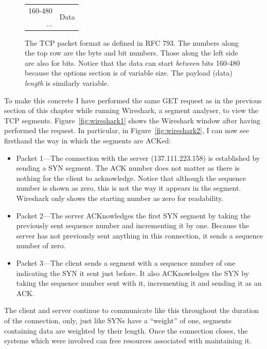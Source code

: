 \documentclass[11pt,a4paper]{report}
\newlength{\portraittextwidth}
\begin{document}
\begin{figure}
\begin{tabular}{r|c|c|c|c|c|c|c|c|c|c|c|c|c|c|c|c|c|c|c|c|c|c|c|c|c|c|c|c|c|c|c|c|}
		160-480 & \multicolumn{32}{c|}{\multirow{2}{*}{Data}}                                                                                                                                                                                     \\
		...     & \multicolumn{32}{c|}{}                                                                                                                                                                                                          \\ \cline{2-33} 
		\end{tabular}
		\captionsetup{width=\portraittextwidth}
		\caption{The TCP packet format as defined in RFC 793. The numbers along the top row are the byte and bit numbers. Those along the left side are also for bits. Notice that the data can start \textit{between} bits 160-480 because the options section is of variable size. The payload (data) \textit{length} is similarly variable.}
		\label{fig:tcpheader}
	\end{figure}
		
	To make this concrete I have performed the same GET request as in the previous section of this chapter while running Wireshark, a segment analyser, to view the TCP segments. Figure~\ref{fig:wireshark1} shows the Wireshark window after having performed the request. In particular, in Figure~\ref{fig:wireshark2}, I can now see firsthand the way in which the segments are ACKed:
	\begin{itemize}
		\item Packet 1---The connection with the server (137.111.223.158) is established by sending a SYN segment. The ACK number does not matter as there is nothing for the client to acknowledge. Notice that although the sequence number is shown as zero, this is not the way it appears in the segment. Wireshark only shows the starting number as zero for readability.
		\item Packet 2---The server ACKnowledges the first SYN segment by taking the previously sent sequence number and incrementing it by one. Because the server has not previously sent anything in this connection, it sends a sequence number of zero.
		\item Packet 3---The client sends a segment with a sequence number of one indicating the SYN it sent just before. It also ACKnowledges the SYN by taking the sequence number sent with it, incrementing it and sending it as an ACK.
	\end{itemize}
	The client and server continue to communicate like this throughout the duration of the connection, only, just like SYNs have a ``weight'' of one, segments containing data are weighted by their length. Once the connection closes, the systems which were involved can free resources associated with maintaining it.
	
\end{document}
